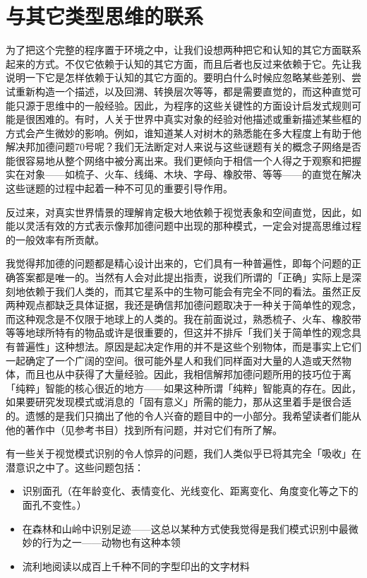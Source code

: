 \documentclass[
  12pt,
  twoside,
  openright,
  oldfontcommands,
]{memoir}
\providecommand{\tightlist}{%
  \setlength{\itemsep}{0pt}\setlength{\parskip}{0pt}}
\begin{document}
\section{与其它类型思维的联系}

为了把这个完整的程序置于环境之中，让我们设想两种把它和认知的其它方面联系起来的方式。不仅它依赖于认知的其它方面，而且后者也反过来依赖于它。先让我说明一下它是怎样依赖于认知的其它方面的。要明白什么时候应忽略某些差别、尝试重新构造一个描述，以及回溯、转换层次等等，都是需要直觉的，而这种直觉可能只源于思维中的一般经验。因此，为程序的这些关键性的方面设计启发式规则可能是很困难的。有时，人关于世界中真实对象的经验对他描述或重新描述某些框的方式会产生微妙的影响。例如，谁知道某人对树木的熟悉能在多大程度上有助于他解决邦加德问题70号呢？我们无法断定对人来说与这些谜题有关的概念子网络是否能很容易地从整个网络中被分离出来。我们更倾向于相信一个人得之于观察和把握实在对象------如梳子、火车、线绳、木块、字母、橡胶带、等等------的直觉在解决这些谜题的过程中起着一种不可见的重要引导作用。

反过来，对真实世界情景的理解肯定极大地依赖于视觉表象和空间直觉，因此，如能以灵活有效的方式表示像邦加德问题中出现的那种模式，一定会对提高思维过程的一般效率有所贡献。

我觉得邦加德的问题都是精心设计出来的，它们具有一种普遍性，即每个问题的正确答案都是唯一的。当然有人会对此提出指责，说我们所谓的「正确」实际上是深刻地依赖于我们人类的，而其它星系中的生物可能会有完全不同的看法。虽然正反两种观点都缺乏具体证据，我还是确信邦加德问题取决于一种关于简单性的观念，而这种观念是不仅限于地球上的人类的。我在前面说过，熟悉梳子、火车、橡胶带等等地球所特有的物品或许是很重要的，但这并不排斥「我们关于简单性的观念具有普遍性」这种想法。原因是起决定作用的并不是这些个别物体，而是事实上它们一起确定了一个广阔的空间。很可能外星人和我们同样面对大量的人造或天然物体，而且也从中获得了大量经验。因此，我相信解邦加德问题所用的技巧位于离「纯粹」智能的核心很近的地方------如果这种所谓「纯粹」智能真的存在。因此，如果要研究发现模式或消息的「固有意义」所需的能力，那从这里着手是很合适的。遗憾的是我们只摘出了他的令人兴奋的题目中的一小部分。我希望读者们能从他的著作中（见参考书目）找到所有问题，并对它们有所了解。

有一些关于视觉模式识别的令人惊异的问题，我们人类似乎已将其完全「吸收」在潜意识之中了。这些问题包括：

\begin{itemize}
\tightlist
\item
  识别面孔（在年龄变化、表情变化、光线变化、距离变化、角度变化等之下的面孔不变性。）
\item
  在森林和山岭中识别足迹------这总以某种方式使我觉得是我们模式识别中最微妙的行为之一------动物也有这种本领
\item
  流利地阅读以成百上千种不同的字型印出的文字材料
\end{itemize}
\end{document}
